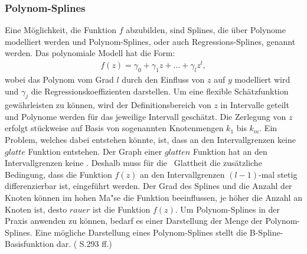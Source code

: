 \documentclass[12pt]{scrreprt}
\begin{document}
\subsubsection{Polynom-Splines}
Eine Möglichkeit, die Funktion $f$ abzubilden, sind Splines, die über Polynome modelliert werden und Polynom-Splines, oder auch Regressions-Splines, genannt werden. Das polynomiale Modell hat die Form: 
\begin{align}
f(z)=\gamma_{0}+\gamma_{1}z+...+\gamma_{l}z^l,
\end{align}
wobei das Polynom vom Grad $l$ durch den Einfluss von $z$ auf $y$ modelliert wird und $\gamma_{j}$ die Regressionskoeffizienten darstellen. Um eine flexible Schätzfunktion gewährleisten zu können, wird der Definitionsbereich von $z$ in Intervalle geteilt und Polynome werden für das jeweilige Intervall geschätzt. Die Zerlegung von $z$ erfolgt stückweise auf Basis von sogenannten Knotenmengen $k_{1}$ bis $k_{m}$.  Ein Problem, welches dabei entstehen könnte, ist, dass an den Intervallgrenzen keine $glatte$ Funktion entstehen. Der Graph einer $glatten$ Funktion hat an den Intervallgrenzen keine . Deshalb muss für die \grqq ~Glattheit die zusätzliche Bedingung, dass die Funktion $f(z)$ an den Intervallgrenzen $(l-1)$-mal stetig differenzierbar ist, eingeführt werden. Der Grad des Splines und die Anzahl der Knoten können im hohen Ma"se die Funktion beeinflussen, je höher die Anzahl an Knoten ist, desto $rauer$ ist die Funktion $f(z)$. Um Polynom-Splines in der Praxis anwenden zu können, bedarf es einer Darstellung der Menge der Polynom-Splines. Eine mögliche Darstellung eines Polynom-Splines stellt die B-Spline-Basisfunktion dar. (\cite{fahrmeir2007regression} S.293 ff.)
\end{document}
